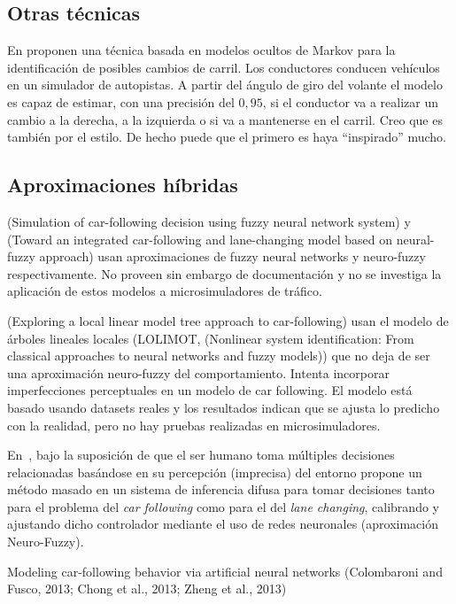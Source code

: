 \subsection{Otras técnicas}

En \cite{Hou2011} proponen una técnica basada en modelos ocultos de Markov para la identificación de posibles cambios de carril. Los conductores conducen vehículos en un simulador de autopistas. A partir del ángulo de giro del volante el modelo es capaz de estimar, con una precisión del $0,95$, si el conductor va a realizar un cambio a la derecha, a la izquierda o si va a mantenerse en el carril. Creo que \cite{Berndt2008} es también por el estilo. De hecho puede que el primero es haya \enquote{inspirado} mucho.

\subsection{Aproximaciones híbridas}

(Simulation of car-following decision using fuzzy neural network system) y (Toward an integrated car-following and lane-changing model based on neural-fuzzy approach) usan aproximaciones de fuzzy neural networks y neuro-fuzzy respectivamente. No proveen sin embargo de documentación y no se investiga la aplicación de estos modelos a microsimuladores de tráfico.

(Exploring a local linear model tree approach to car-following) usan el modelo de árboles lineales locales (LOLIMOT, (Nonlinear system identification: From classical approaches to neural networks and fuzzy models)) que no deja de ser una aproximación neuro-fuzzy del comportamiento. Intenta incorporar imperfecciones perceptuales en un modelo de car following. El modelo está basado usando datasets reales y los resultados indican que se ajusta lo predicho con la realidad, pero no hay pruebas realizadas en microsimuladores.

En~\cite{Ma2004}, bajo la suposición de que el ser humano toma múltiples decisiones relacionadas basándose en su percepción (imprecisa) del entorno propone un método masado en un sistema de inferencia difusa para tomar decisiones tanto para el problema del \textit{car following} como para el del \textit{lane changing}, calibrando y ajustando dicho controlador mediante el uso de redes neuronales (aproximación Neuro-Fuzzy).

Modeling car-following behavior via artificial neural networks (Colombaroni and Fusco, 2013; Chong et al., 2013; Zheng et al., 2013)
